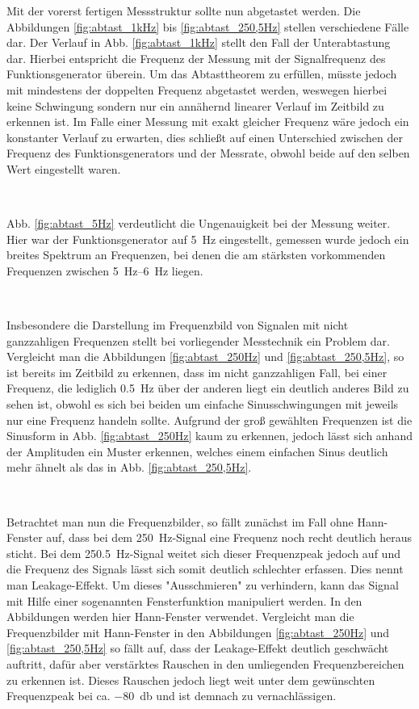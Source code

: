 Mit der vorerst fertigen Messstruktur sollte nun abgetastet werden.
Die Abbildungen \ref{fig:abtast_1kHz} bis \ref{fig:abtast_250,5Hz} stellen verschiedene Fälle dar.
Der Verlauf in Abb. \ref{fig:abtast_1kHz} stellt den Fall der Unterabtastung dar.
Hierbei entspricht die Frequenz der Messung mit der Signalfrequenz des Funktionsgenerator überein.
Um das Abtasttheorem zu erfüllen, müsste jedoch mit mindestens der doppelten Frequenz abgetastet werden, weswegen hierbei keine Schwingung sondern nur ein annähernd linearer Verlauf im Zeitbild zu erkennen ist.
Im Falle einer Messung mit exakt gleicher Frequenz wäre jedoch ein konstanter Verlauf zu erwarten, dies schließt auf einen Unterschied zwischen der Frequenz des Funktionsgenerators und der Messrate, obwohl beide auf den selben Wert eingestellt waren.
	
\

Abb. \ref{fig:abtast_5Hz} verdeutlicht die Ungenauigkeit bei der Messung weiter.
Hier war der Funktionsgenerator auf \SI{5}{\hertz} eingestellt, gemessen wurde jedoch ein breites Spektrum an Frequenzen, bei denen die am stärksten vorkommenden Frequenzen zwischen \SIrange{5}{6}{\hertz} liegen.
	
\

Insbesondere die Darstellung im Frequenzbild von Signalen mit nicht ganzzahligen Frequenzen stellt bei vorliegender Messtechnik ein Problem dar.
Vergleicht man die Abbildungen \ref{fig:abtast_250Hz} und \ref{fig:abtast_250,5Hz}, so ist bereits im Zeitbild zu erkennen, dass im nicht ganzzahligen Fall, bei einer Frequenz, die lediglich \SI{0,5}{\hertz} über der anderen liegt ein deutlich anderes Bild zu sehen ist, obwohl es sich bei beiden um einfache Sinusschwingungen mit jeweils nur eine Frequenz handeln sollte.
Aufgrund der groß gewählten Frequenzen ist die Sinusform in Abb. \ref{fig:abtast_250Hz} kaum zu erkennen, jedoch lässt sich anhand der Amplituden ein Muster erkennen, welches einem einfachen Sinus deutlich mehr ähnelt als das in Abb. \ref{fig:abtast_250,5Hz}.
	
\

Betrachtet man nun die Frequenzbilder, so fällt zunächst im Fall ohne Hann-Fenster auf, dass bei dem \SI{250}{\hertz}-Signal eine Frequenz noch recht deutlich heraus sticht.
Bei dem \SI{250,5}{\hertz}-Signal weitet sich dieser Frequenzpeak jedoch auf und die Frequenz des Signals lässt sich somit deutlich schlechter erfassen.
Dies nennt man Leakage-Effekt.
Um dieses "Ausschmieren" zu verhindern, kann das Signal mit Hilfe einer sogenannten Fensterfunktion manipuliert werden.
In den Abbildungen werden hier Hann-Fenster verwendet.
Vergleicht man die Frequenzbilder mit Hann-Fenster in den Abbildungen \ref{fig:abtast_250Hz} und \ref{fig:abtast_250,5Hz} so fällt auf, dass der Leakage-Effekt deutlich geschwächt auftritt, dafür aber verstärktes Rauschen in den umliegenden Frequenzbereichen zu erkennen ist.
Dieses Rauschen jedoch liegt weit unter dem gewünschten Frequenzpeak bei ca. \SI{-80}{\decibel} und ist demnach zu vernachlässigen.

